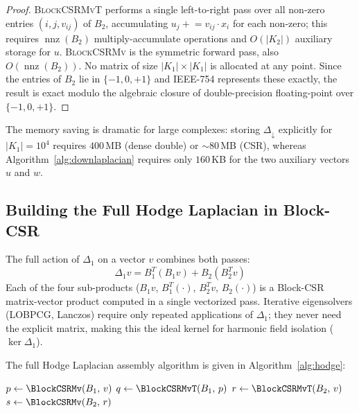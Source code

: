 \begin{proof}
\textsc{BlockCSRMvT} performs a single left-to-right pass over all non-zero
entries $(i,j,v_{ij})$ of $B_2$, accumulating $u_j \mathrel{+}= v_{ij} \cdot x_i$
for each non-zero; this requires $\operatorname{nnz}(B_2)$ multiply-accumulate
operations and $O(|K_2|)$ auxiliary storage for $u$.
\textsc{BlockCSRMv} is the symmetric forward pass, also $O(\operatorname{nnz}(B_2))$.
No matrix of size $|K_1| \times |K_1|$ is allocated at any point.
Since the entries of $B_2$ lie in $\{-1,0,+1\}$ and IEEE-754 represents
these exactly, the result is exact modulo the algebraic closure of
double-precision floating-point over $\{-1,0,+1\}$.
\end{proof}

\begin{remark}
The memory saving is dramatic for large complexes: storing $\Delta_\downarrow$
explicitly for $|K_1| = 10^4$ requires $400$\,MB (dense double) or
$\sim 80$\,MB (CSR), whereas Algorithm~\ref{alg:downlaplacian} requires
only $160$\,KB for the two auxiliary vectors $u$ and $w$.
\end{remark}

\subsection{Building the Full Hodge Laplacian in Block-CSR}
\label{subsec:full_hodge}

The full action of $\Delta_1$ on a vector $v$ combines both passes:
\begin{equation}
    \Delta_1 v = B_1^T(B_1 v) + B_2(B_2^T v)
\end{equation}
Each of the four sub-products ($B_1 v$, $B_1^T(\cdot)$,
$B_2^T v$, $B_2(\cdot)$) is a Block-CSR matrix-vector product computed
in a single vectorized pass.  Iterative eigensolvers (LOBPCG,
Lanczos) require only repeated applications of $\Delta_1$; they never
need the explicit matrix, making this the ideal kernel for harmonic
field isolation ($\ker \Delta_1$).

The full Hodge Laplacian assembly algorithm is given in
Algorithm~\ref{alg:hodge}:

\begin{algorithm}[H]
\caption{Block-CSR Action of the Full Hodge Laplacian $\Delta_1$.}
\label{alg:hodge}
\BlankLine
$p \leftarrow \BlockCSRMv(B_1,\, v)$
$q \leftarrow \BlockCSRMvT(B_1,\, p)$
$r \leftarrow \BlockCSRMvT(B_2,\, v)$
$s \leftarrow \BlockCSRMv(B_2,\, r)$
\end{algorithm}

